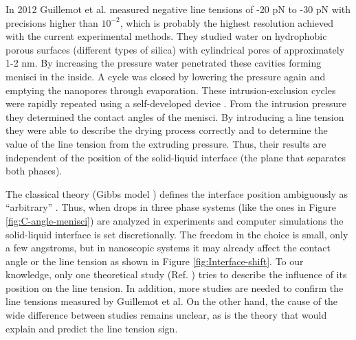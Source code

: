In 2012 Guillemot et al. \cite{guillemot:2012} measured negative
line tensions of -20 pN to -30 pN with precisions higher than $10^{-2}$,
which is probably the highest resolution achieved with the current
experimental methods. They studied water on hydrophobic porous surfaces
(different types of silica) with cylindrical pores of approximately
1-2 nm. By increasing the pressure water penetrated these cavities
forming menisci in the inside. A cycle was closed by lowering the
pressure again and emptying the nanopores through evaporation. These
intrusion-exclusion cycles were rapidly repeated using a self-developed
device \cite{guillemot:2012a}. From the intrusion pressure they
determined the contact angles of the menisci. By introducing a line
tension they were able to describe the drying process correctly
and to determine the value of the line tension from the extruding
pressure. Thus, their results are independent of the position of
the solid-liquid interface (the plane that separates both phases).

The classical theory (Gibbs model \cite{gibbs:1873,gibbs:1948}) defines
the interface position ambiguously as ``arbitrary'' \cite{rowlinson:2002,lang:2012}.
Thus, when drops in three phase systems (like the ones in Figure \ref{fig:C-angle-menisci})
are analyzed in experiments and computer simulations
the solid-liquid interface is set discretionally. The freedom in the
choice is small, only a few angstroms, but in nanoscopic systems it
may already affect the contact angle or the line tension as shown
in Figure \ref{fig:Interface-shift}. To our knowledge, only one theoretical
study (Ref. \cite{rusanov:2004}) tries to describe the influence
of its position on the line tension. In addition, more studies are
needed to confirm the line tensions measured by Guillemot et al.
On the other hand, the cause of the wide difference between studies
remains unclear, as is the theory that would explain and predict the
line tension sign.